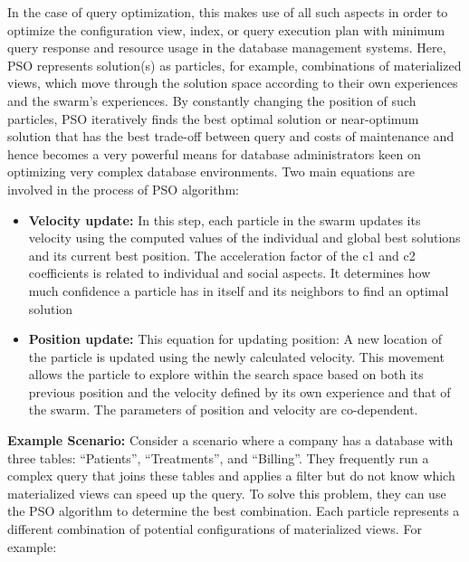 In the case of query optimization, this makes use of all such aspects in order to optimize the configuration view, index, or query execution plan with minimum query response and resource usage in the database management systems. Here, PSO represents solution(s) as particles, for example, combinations of materialized views, which move through the solution space according to their own experiences and the swarm's experiences. By constantly changing the position of such particles, PSO iteratively finds the best optimal solution or near-optimum solution that has the best trade-off between query and costs of maintenance and hence becomes a very powerful means for database administrators keen on optimizing very complex database environments. Two main equations are involved in the process of PSO algorithm:\vspace{.4cm}
\begin{itemize}
    \item \textbf{Velocity update:} In this step, each particle in the swarm updates its velocity using the computed values of the individual and global best solutions and its current best position. The acceleration factor of the c1 and c2 coefficients is related to individual and social aspects. It determines how much confidence a particle has in itself and its neighbors to find an optimal solution \cite{baeldung2024pso}

    
    
    \item \textbf{Position update:} This equation for updating position: A new location of the particle is updated using the newly calculated velocity. This movement allows the particle to explore within the search space based on both its previous position and the velocity defined by its own experience and that of the swarm. The parameters of position and velocity are co-dependent.
    
    

\end{itemize} 

\textbf{Example Scenario:} Consider a scenario where a company has a database with three tables: ``Patients'', ``Treatments'', and ``Billing''. They frequently run a complex query that joins these tables and applies a filter but do not know which materialized views can speed up the query. To solve this problem, they can use the PSO algorithm to determine the best combination. Each particle represents a different combination of potential configurations of materialized views. For example:


